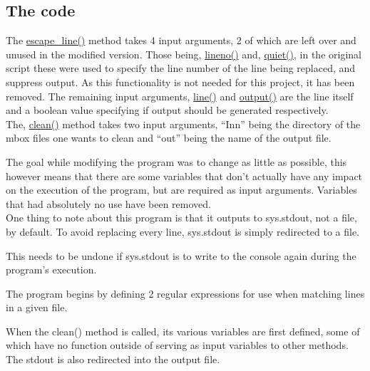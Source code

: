 \documentclass[a4paper,english]{report}
\begin{document}
\subsection{The code}

The \url{escape_line()} method takes 4 input arguments, 2 of which are left over and unused in the modified version.  Those being, \url{lineno()} and, \url{quiet()}, in the original script these were used to specify the line number of the line being replaced, and suppress output. As this functionality is not needed for this project, it has been removed. The remaining input arguments, \url{line()} and \url{output()} are the line itself and a boolean value specifying if output should be generated respectively. \\

The, \url{clean()} method takes two input arguments, “Inn” being the directory of the mbox files one wants to clean and “out” being the name of the output file.

The goal while modifying the program was to change as little as possible, this however means that there are some variables that don't actually have any impact on the execution of the program, but are required as input arguments. Variables that had absolutely no use have been removed.\\

One thing to note about this program is that it outputs to sys.stdout, not a file, by default. To avoid replacing every line,  sys.stdout is simply redirected to a file.




This needs to be undone if sys.stdout is to write to the console again during the program's execution.\\

\noindent

The program begins by defining 2 regular expressions for use when matching lines in a given file. 





When the clean() method is called, its various variables are first defined, some of which have no function outside of serving as input variables to other methods. The stdout is also redirected into the output file.


\end{document}
